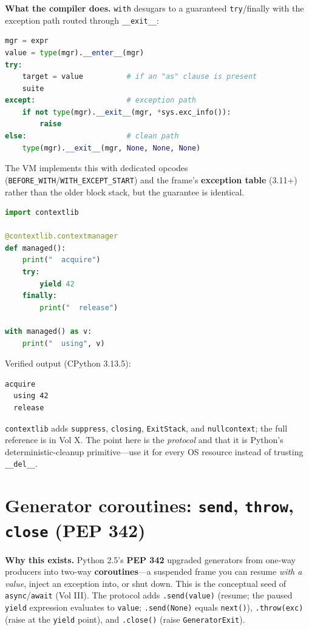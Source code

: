 \textbf{What the compiler does.} \texttt{with} desugars to a guaranteed \texttt{try}/finally
with the exception path routed through \texttt{\_\_exit\_\_}:

\begin{lstlisting}[language=Python, caption={Conceptual desugaring of: with expr as target: suite}]
mgr = expr
value = type(mgr).__enter__(mgr)
try:
    target = value          # if an "as" clause is present
    suite
except:                     # exception path
    if not type(mgr).__exit__(mgr, *sys.exc_info()):
        raise
else:                       # clean path
    type(mgr).__exit__(mgr, None, None, None)
\end{lstlisting}

The VM implements this with dedicated opcodes (\texttt{BEFORE\_WITH}/\texttt{WITH\_EXCEPT\_START})
and the frame's \textbf{exception table} (3.11+) rather than the older block stack, but the
guarantee is identical.

\begin{lstlisting}[language=Python, caption={A generator-based context manager.}]
import contextlib

@contextlib.contextmanager
def managed():
    print("  acquire")
    try:
        yield 42
    finally:
        print("  release")

with managed() as v:
    print("  using", v)
\end{lstlisting}

Verified output (CPython 3.13.5):

\begin{lstlisting}[caption={Output}]
  acquire
  using 42
  release
\end{lstlisting}

\texttt{contextlib} adds \texttt{suppress}, \texttt{closing}, \texttt{ExitStack}, and
\texttt{nullcontext}; the full reference is in Vol X. The point here is the \emph{protocol} and
that it is Python's deterministic-cleanup primitive---use it for every OS resource instead of
trusting \texttt{\_\_del\_\_}.

\section{Generator coroutines: \texttt{send}, \texttt{throw}, \texttt{close} (PEP 342)}

\textbf{Why this exists.} Python 2.5's \textbf{PEP 342} upgraded generators from one-way
producers into two-way \textbf{coroutines}---a suspended frame you can resume \emph{with a
value}, inject an exception into, or shut down. This is the conceptual seed of
\texttt{async}/\texttt{await} (Vol III). The protocol adds \texttt{.send(value)} (resume; the
paused \texttt{yield} expression evaluates to \texttt{value}; \texttt{.send(None)} equals
\texttt{next()}), \texttt{.throw(exc)} (raise at the \texttt{yield} point), and
\texttt{.close()} (raise \texttt{GeneratorExit}).

